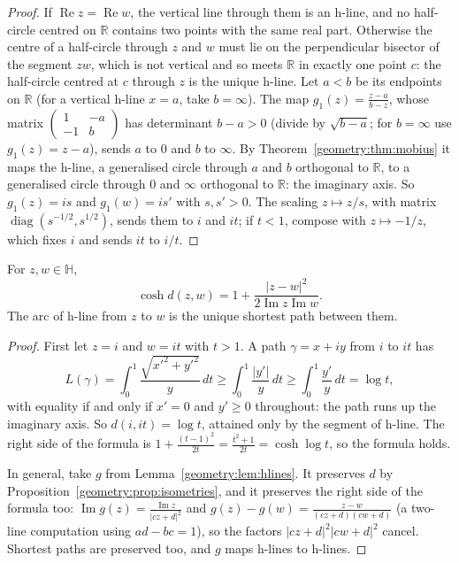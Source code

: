 \begin{proof}
If $\operatorname{Re}z=\operatorname{Re}w$, the vertical line through them is an h-line, and no half-circle centred on $\mathbb R$ contains two points with the
same real part. Otherwise the centre of a half-circle through $z$ and $w$ must lie on the perpendicular bisector of the segment $zw$, which is not vertical
and so meets $\mathbb R$ in exactly one point $c$: the half-circle centred at $c$ through $z$ is the unique h-line. Let $a<b$ be its endpoints on
$\mathbb R$ (for a vertical h-line $x=a$, take $b=\infty$). The map $g_1(z)=\frac{z-a}{b-z}$, whose matrix $\begin{pmatrix}1&-a\\-1&b\end{pmatrix}$ has
determinant $b-a>0$ (divide by $\sqrt{b-a}$; for $b=\infty$ use $g_1(z)=z-a$), sends $a$ to $0$ and $b$ to $\infty$. By Theorem~\ref{geometry:thm:mobius} it maps the h-line,
a generalised circle through $a$ and $b$ orthogonal to $\mathbb R$, to a generalised circle through $0$ and $\infty$ orthogonal to $\mathbb R$: the imaginary axis.
So $g_1(z)=is$ and $g_1(w)=is'$ with $s,s'>0$. The scaling $z\mapsto z/s$, with matrix $\operatorname{diag}(s^{-1/2},s^{1/2})$, sends them to $i$ and $it$; if
$t<1$, compose with $z\mapsto-1/z$, which fixes $i$ and sends $it$ to $i/t$.
\end{proof}

\begin{theorem}\label{geometry:thm:hypdist}
For $z,w\in\mathbb H$,
\[
\cosh d(z,w)=1+\frac{|z-w|^2}{2\operatorname{Im}z\operatorname{Im}w}.
\]
The arc of h-line from $z$ to $w$ is the unique shortest path between them.
\end{theorem}

\begin{proof}
First let $z=i$ and $w=it$ with $t>1$. A path $\gamma=x+iy$ from $i$ to $it$ has
\[
L(\gamma)=\int_0^1\frac{\sqrt{x'^2+y'^2}}y\,dt\ge\int_0^1\frac{|y'|}y\,dt\ge\int_0^1\frac{y'}y\,dt=\log t,
\]
with equality if and only if $x'=0$ and $y'\ge0$ throughout: the path runs up the imaginary axis. So $d(i,it)=\log t$, attained only by the segment of
h-line. The right side of the formula is $1+\frac{(t-1)^2}{2t}=\frac{t^2+1}{2t}=\cosh\log t$, so the formula holds.

In general, take $g$ from Lemma~\ref{geometry:lem:hlines}. It preserves $d$ by Proposition~\ref{geometry:prop:isometries}, and it preserves the right side of the formula too:
$\operatorname{Im}g(z)=\frac{\operatorname{Im}z}{|cz+d|^2}$ and $g(z)-g(w)=\frac{z-w}{(cz+d)(cw+d)}$ (a two-line computation using $ad-bc=1$), so the factors
$|cz+d|^2|cw+d|^2$ cancel. Shortest paths are preserved too, and $g$ maps h-lines to h-lines.
\end{proof}

